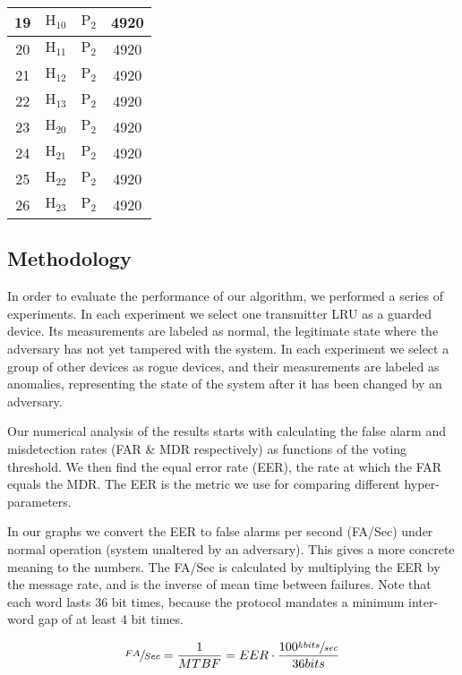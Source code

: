 \documentclass[conference]{IEEEtran}
\begin{document}
\begin{table}
\begin{tabular}{|c | c c c|}
      19 & \(\text{H}_{10}\) & \(\text{P}_2\) & 4920 \\
      \hline
      20 & \(\text{H}_{11}\) & \(\text{P}_2\) & 4920 \\
      \hline
      21 & \(\text{H}_{12}\) & \(\text{P}_2\) & 4920 \\
      \hline
      22 & \(\text{H}_{13}\) & \(\text{P}_2\) & 4920 \\
      \hline
      23 & \(\text{H}_{20}\) & \(\text{P}_2\) & 4920 \\
      \hline
      24 & \(\text{H}_{21}\) & \(\text{P}_2\) & 4920 \\
      \hline
      25 & \(\text{H}_{22}\) & \(\text{P}_2\) & 4920 \\
      \hline
      26 & \(\text{H}_{23}\) & \(\text{P}_2\) & 4920 \\
      \hline
    \end{tabular}
  \end{table}
  
\subsection{Methodology}
  In order to evaluate the performance of our algorithm, we performed a series of experiments. In each experiment we select one transmitter LRU as a guarded device. Its measurements are labeled as normal, the legitimate state where the adversary has not yet tampered with the system. In each experiment we select a group of other devices as rogue devices, and their measurements are labeled as anomalies, representing the state of the system after it has been changed by an adversary.
  
  Our numerical analysis of the results starts with calculating the false alarm and misdetection rates (FAR \& MDR respectively) as functions of the voting threshold. We then find the equal error rate (EER), the rate at which the FAR equals the MDR. The EER is the metric we use for comparing different hyper-parameters.
  
   In our graphs we convert the EER to false alarms per second (FA/Sec) under normal operation (system unaltered by an adversary). This gives a more concrete meaning to the numbers. The FA/Sec is calculated by multiplying the EER by the message rate, and is the inverse of mean time between failures. Note that each word lasts 36 bit times, because the protocol mandates a minimum inter-word gap of at least 4 bit times.
  
  \[\sfrac{FA}{Sec} = \frac{1}{MTBF} = EER \cdot \frac{100 \sfrac{kbits}{sec}}{36bits}\]
  
\end{document}
